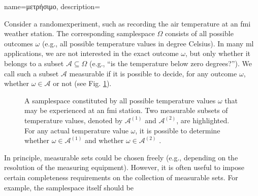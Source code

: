 {name={\foreignlanguage{greek}{μετρήσιμο}}, 
	description={Consider a \gls{randomexperiment}, such as recording 
		the air temperature at an \gls{fmi} weather station. The corresponding \gls{samplespace} $\Omega$ 
		consists of all possible outcomes $\omega$ (e.g., all possible temperature values in degree Celsius). 
		In many \gls{ml} applications, we are not interested in the exact outcome $\omega$, but only whether 
		it belongs to a subset $\mathcal{A} \subseteq \Omega$ (e.g., “is the temperature below zero degrees?”). 
		We call such a subset $\mathcal{A}$ measurable if it is possible to decide, for any outcome $\omega$, 
		whether $\omega \in \mathcal{A}$ or not (see Fig. \ref{fig_measurable_dict}). \\
		\begin{figure}[H]
		\begin{center}
			\vspace*{10mm}
			\end{center}
		\caption{A \gls{samplespace} constituted by all possible temperature values $\omega$ 
			that may be experienced at an \gls{fmi} station. Two measurable subsets of temperature 
			values, denoted by $\mathcal{A}^{(1)}$ and $\mathcal{A}^{(2)}$, are highlighted. For any 
			actual temperature value $\omega$, it is possible to determine whether $\omega \in \mathcal{A}^{(1)}$ 
			and whether $\omega \in \mathcal{A}^{(2)}$ \label{fig_measurable_dict}. } 
		\end{figure}
		In principle, measurable sets could be chosen freely (e.g., depending on the resolution of the 
		measuring equipment). However, it is often useful to impose certain completeness requirements 
		on the collection of measurable sets. For example, the \gls{samplespace} itself should be 
}}
